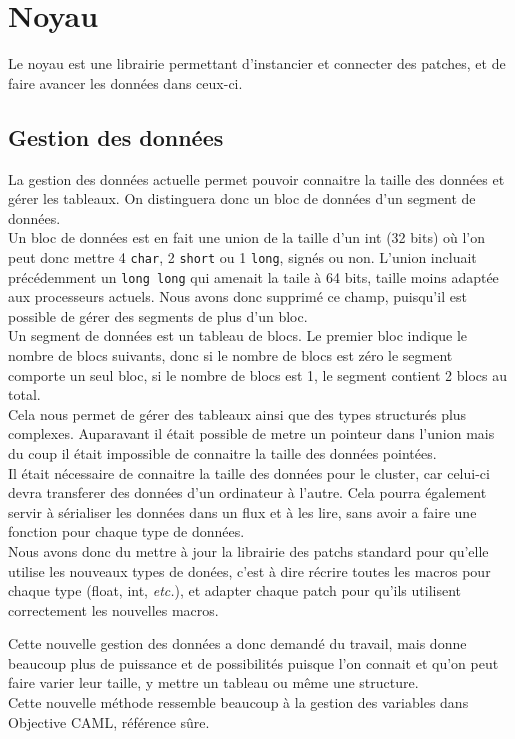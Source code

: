 \chapter{Noyau}

Le noyau est une librairie permettant d'instancier et connecter
des patches, et de faire avancer les donn\'ees dans ceux-ci.

\section{Gestion des donn\'ees}
\label{noyau_donnees}

La gestion des donn\'ees actuelle permet pouvoir connaitre la taille des 
donn\'ees et  g\'erer les tableaux.
On distinguera donc un bloc de donn\'ees d'un segment de donn\'ees.\\

Un bloc de donn\'ees est en fait une union de la taille d'un int (32 bits)
o\`u l'on peut donc mettre 4 {\tt char}, 2 {\tt short} ou 1 {\tt long},
 sign\'es ou non.
L'union incluait pr\'ec\'edemment un {\tt long long} qui amenait la taile
\`a 64 bits, taille moins adapt\'ee aux processeurs actuels. Nous avons donc
supprim\'e ce champ, puisqu'il est possible de g\'erer des segments de plus
d'un bloc.\\

Un segment de donn\'ees est un tableau de blocs.
Le premier bloc indique le nombre de blocs suivants,
donc si le nombre de blocs est z\'ero le segment comporte un seul bloc,
si le nombre de blocs est 1, le segment contient 2 blocs au total.\\

Cela nous permet de g\'erer des tableaux ainsi que des types structur\'es
plus complexes. Auparavant il \'etait possible de metre un pointeur
dans l'union mais du coup il \'etait impossible de connaitre
la taille des donn\'ees point\'ees.\\

Il \'etait n\'ecessaire de connaitre la taille des donn\'ees pour le cluster,
car celui-ci devra transferer des donn\'ees d'un ordinateur
\`a l'autre. Cela pourra \'egalement servir \`a s\'erialiser les donn\'ees
dans un flux et \`a les lire, sans avoir a faire une fonction pour chaque
type de donn\'ees.\\

Nous avons donc du mettre \`a jour la librairie des patchs standard
pour qu'elle utilise les nouveaux types de don\'ees, c'est \`a dire r\'ecrire
toutes les macros pour chaque type (float, int, {\em etc.}), et adapter
chaque patch pour qu'ils utilisent correctement les nouvelles macros.\\

\newpage

Cette nouvelle gestion des donn\'ees a donc demand\'e du travail,
mais donne beaucoup plus de puissance et de possibilit\'es puisque
l'on connait et qu'on peut faire varier leur taille, y mettre un tableau
ou m\^eme une structure. \\
Cette nouvelle m\'ethode ressemble beaucoup \`a la gestion
des variables dans Objective CAML, r\'ef\'erence s\^ure.\\
